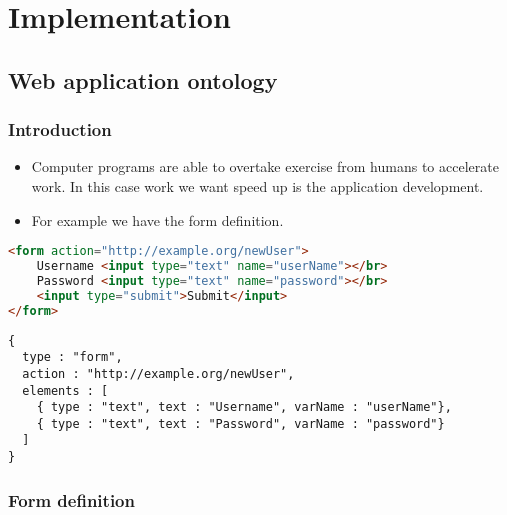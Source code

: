 \chapter{Implementation}

\section{Web application ontology}

\subsection{Introduction}

\begin{itemize}
	\item Computer programs are able to overtake exercise from humans to accelerate work. In this case work we want speed up is the application development. 
\end{itemize}


\begin{itemize}
	\item  For example we have the form definition.
\end{itemize}


\begin{lstlisting}[language=html, basicstyle=\footnotesize]
<form action="http://example.org/newUser">
   	Username <input type="text" name="userName"></br>
	Password <input type="text" name="password"></br>
	<input type="submit">Submit</input>
</form>
\end{lstlisting}


\begin{lstlisting}[basicstyle=\footnotesize]
{
  type : "form",
  action : "http://example.org/newUser",
  elements : [
    { type : "text", text : "Username", varName : "userName"},
    { type : "text", text : "Password", varName : "password"}
  ]
}
\end{lstlisting}



\subsection{Form definition}

